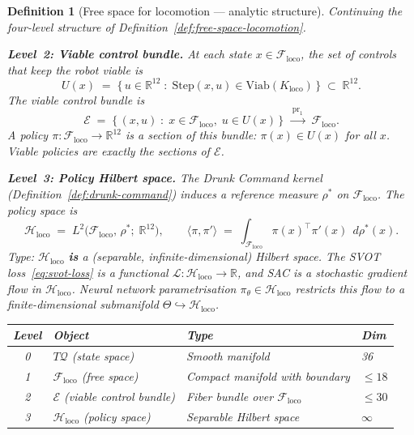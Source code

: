 \documentclass[11pt,a4paper]{article}
\newtheorem{definition}[theorem]{Definition}
\newcommand{\R}{\mathbb{R}}
\newcommand{\cL}{\mathcal{L}}
\newcommand{\cF}{\mathcal{F}}
\newcommand{\cE}{\mathcal{E}}
\newcommand{\cH}{\mathcal{H}}
\newcommand{\ip}[2]{\langle #1, #2 \rangle}
\begin{document}
\begin{definition}[Free space for locomotion --- analytic structure]
\label{def:free-space-analytic}
Continuing the four-level structure
of Definition~\ref{def:free-space-locomotion}.

\medskip\noindent
\textbf{Level~2: Viable control bundle.}\;
At each state $x \in \cF_{\mathrm{loco}}$,
the set of controls that keep the robot viable
is
\begin{equation}\label{eq:viable-controls}
  U(x)
  \;=\;
  \bigl\{\,
    u \in \R^{12}
    \;:\;
    \mathrm{Step}(x, u) \in \mathrm{Viab}(K_{\mathrm{loco}})
  \,\bigr\}
  \;\subset\; \R^{12}.
\end{equation}
The \emph{viable control bundle} is
\[
  \cE
  \;=\;
  \bigl\{\,
    (x, u) \;:\;
    x \in \cF_{\mathrm{loco}},\;
    u \in U(x)
  \,\bigr\}
  \;\xrightarrow{\;\mathrm{pr}_1\;}\;
  \cF_{\mathrm{loco}}.
\]
A policy $\pi : \cF_{\mathrm{loco}} \to \R^{12}$
is a \emph{section} of this bundle:
$\pi(x) \in U(x)$ for all $x$.
Viable policies are exactly the sections of $\cE$.

\medskip\noindent
\textbf{Level~3: Policy Hilbert space.}\;
The Drunk Command kernel
(Definition~\ref{def:drunk-command})
induces a reference measure $\rho^*$
on $\cF_{\mathrm{loco}}$.
The policy space is
\begin{equation}\label{eq:policy-hilbert}
  \cH_{\mathrm{loco}}
  \;=\;
  L^2\!\bigl(\cF_{\mathrm{loco}},\, \rho^*;\;
    \R^{12}\bigr),
  \qquad
  \ip{\pi}{\pi'}
  \;=\;
  \int_{\cF_{\mathrm{loco}}}
    \pi(x)^\top \pi'(x)
  \;\, d\rho^*(x).
\end{equation}
\emph{Type:}\;
$\cH_{\mathrm{loco}}$ \textbf{is} a
(separable, infinite-dimensional) Hilbert space.
The SVOT loss~\eqref{eq:svot-loss}
is a functional $\cL : \cH_{\mathrm{loco}} \to \R$,
and SAC is a stochastic gradient flow in
$\cH_{\mathrm{loco}}$.
Neural network parametrisation
$\pi_\theta \in \cH_{\mathrm{loco}}$
restricts this flow to a finite-dimensional
submanifold $\Theta \hookrightarrow \cH_{\mathrm{loco}}$.

\medskip
\begin{center}
\small
\begin{tabular}{@{}clll@{}}
\toprule
\textbf{Level} & \textbf{Object}
  & \textbf{Type}
  & \textbf{Dim} \\
\midrule
0 & $T\mathcal{Q}$ (state space)
  & Smooth manifold
  & 36 \\
1 & $\cF_{\mathrm{loco}}$ (free space)
  & Compact manifold with boundary
  & $\leq 18$ \\
2 & $\cE$ (viable control bundle)
  & Fiber bundle over $\cF_{\mathrm{loco}}$
  & $\leq 30$ \\
3 & $\cH_{\mathrm{loco}}$ (policy space)
  & Separable Hilbert space
  & $\infty$ \\
\bottomrule
\end{tabular}
\end{center}


\end{definition}
\end{document}
